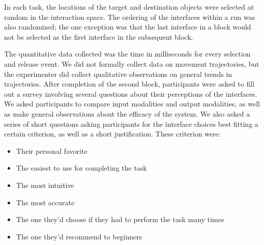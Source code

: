 \documentclass[pageno]{jpaper}
\begin{document}
In each task, the locations of the target and destination objects were selected at random in the interaction space. The
ordering of the interfaces within a run was also randomized; the one exception was that the last interface in a block
would not be selected as the first interface in the subsequent block.

The quantitative data collected was the time in milliseconds for every selection and release event. We did not formally
collect data on movement trajectories, but the experimenter did collect qualitative observations on general trends in
trajectories. After completion of the second block, participants were asked to fill out a survey involving several questions
about their perceptions of the interfaces. We asked participants to compare input modalities and output modalities, as well as
make general observations about the efficacy of the system. We also asked a series of short questions asking participants for
the interface choices best fitting a certain criterion, as well as a short justification. These criterion were:
\begin{itemize}
\item Their personal favorite
\item The easiest to use for completing the task
\item The most intuitive
\item The most accurate
\item The one they'd choose if they had to perform the task many times
\item The one they'd recommend to beginners
\end{itemize}
\end{document}
